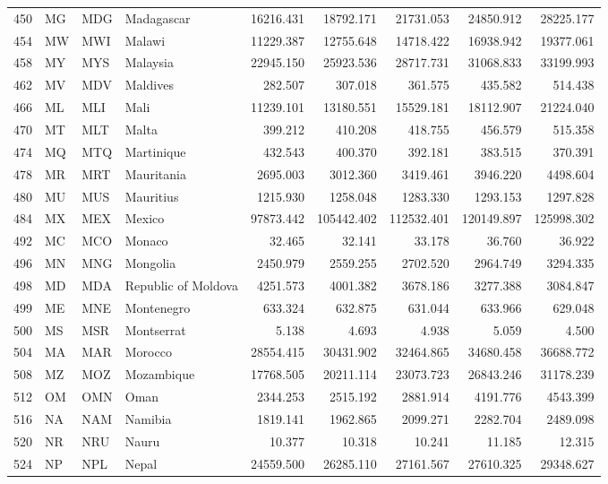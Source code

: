 {\begin{longtable}{rlllrrrrr}
 450 & MG & MDG & Madagascar & 16216.431 & 18792.171 & 21731.053 & 24850.912 & 28225.177 \\
 454 & MW & MWI & Malawi & 11229.387 & 12755.648 & 14718.422 & 16938.942 & 19377.061 \\
 458 & MY & MYS & Malaysia & 22945.150 & 25923.536 & 28717.731 & 31068.833 & 33199.993 \\
 462 & MV & MDV & Maldives & 282.507 & 307.018 & 361.575 & 435.582 & 514.438 \\
 466 & ML & MLI & Mali & 11239.101 & 13180.551 & 15529.181 & 18112.907 & 21224.040 \\
 470 & MT & MLT & Malta & 399.212 & 410.208 & 418.755 & 456.579 & 515.358 \\
 474 & MQ & MTQ & Martinique & 432.543 & 400.370 & 392.181 & 383.515 & 370.391 \\
 478 & MR & MRT & Mauritania & 2695.003 & 3012.360 & 3419.461 & 3946.220 & 4498.604 \\
 480 & MU & MUS & Mauritius & 1215.930 & 1258.048 & 1283.330 & 1293.153 & 1297.828 \\
 484 & MX & MEX & Mexico & 97873.442 & 105442.402 & 112532.401 & 120149.897 & 125998.302 \\
 492 & MC & MCO & Monaco & 32.465 & 32.141 & 33.178 & 36.760 & 36.922 \\
 496 & MN & MNG & Mongolia & 2450.979 & 2559.255 & 2702.520 & 2964.749 & 3294.335 \\
 498 & MD & MDA & Republic of Moldova & 4251.573 & 4001.382 & 3678.186 & 3277.388 & 3084.847 \\
 499 & ME & MNE & Montenegro & 633.324 & 632.875 & 631.044 & 633.966 & 629.048 \\
 500 & MS & MSR & Montserrat & 5.138 & 4.693 & 4.938 & 5.059 & 4.500 \\
 504 & MA & MAR & Morocco & 28554.415 & 30431.902 & 32464.865 & 34680.458 & 36688.772 \\
 508 & MZ & MOZ & Mozambique & 17768.505 & 20211.114 & 23073.723 & 26843.246 & 31178.239 \\
 512 & OM & OMN & Oman & 2344.253 & 2515.192 & 2881.914 & 4191.776 & 4543.399 \\
 516 & NA & NAM & Namibia & 1819.141 & 1962.865 & 2099.271 & 2282.704 & 2489.098 \\
 520 & NR & NRU & Nauru & 10.377 & 10.318 & 10.241 & 11.185 & 12.315 \\
 524 & NP & NPL & Nepal & 24559.500 & 26285.110 & 27161.567 & 27610.325 & 29348.627 \\

\end{longtable}}
